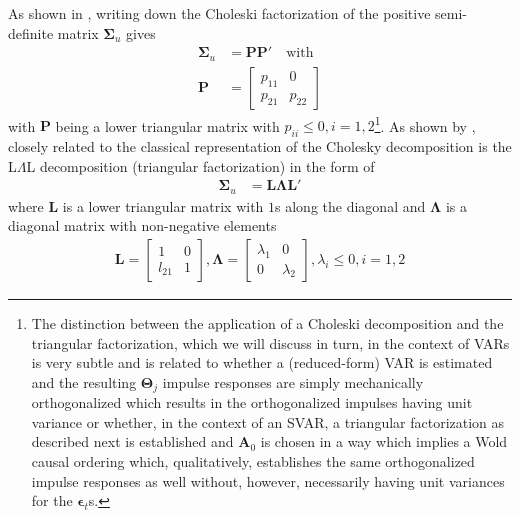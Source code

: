 \documentclass[a4paper,11pt,listof=nochaptergap,oneside,pointednumbers,bibtotoc,bigheadings,liststotoc,hidelinks]{scrbook}
\theoremstyle{mysatz}
\theoremstyle{mydefinition}
\theoremstyle{mytheorem}
\theoremstyle{mybemerkung}
\newcommand{\vect}[1]{\boldsymbol{\mathbf{#1}}}
\begin{document}
As shown in \citet{zivot:00}, writing down the Choleski factorization of the positive semi-definite matrix $\vect{\Sigma}_u$ gives
\begin{equation} \label{eq:svar14}
\begin{split}
 		\vect{\Sigma}_u & = \vect{P}\vect{P'} \quad \text{with} \\
		\vect{P} & = \begin{bmatrix}
    							p_{11} & 0 \\
							p_{21} & p_{22}
 							\end{bmatrix}
\end{split}								
\end{equation}
with $\vect{P}$ being a lower triangular matrix with $p_{ii} \leq 0, i = 1, 2$\footnote{The distinction between the application of a Choleski decomposition and the triangular factorization, which we will discuss in turn, in the context of VARs is very subtle and is related to whether a (reduced-form) VAR is estimated and the resulting $\vect{\Theta}_j$ impulse responses are simply mechanically orthogonalized which results in the orthogonalized impulses having unit variance or whether, in the context of an SVAR, a triangular factorization as described next is established and $\vect{A}_0$ is chosen in a way which implies a Wold causal ordering which, qualitatively, establishes the same orthogonalized impulse responses as well without, however, necessarily having unit variances for the $\vect{\epsilon}_t$s.}. As shown by \citep{zivot:00}, closely related to the classical representation of the Cholesky decomposition is the L$\Lambda$L decomposition (triangular factorization) in the form of 
\begin{equation} \label{eq:svar15}
\begin{split}
 		\vect{\Sigma}_u & = \vect{L}\vect{\Lambda}\vect{L'}
\end{split}								
\end{equation}
where $\vect{L}$ is a lower triangular matrix with $1$s along the diagonal and $\vect{\Lambda}$ is a diagonal matrix with non-negative elements
\begin{equation} \label{eq:svar16}
\begin{split}
	\vect{L} =  \begin{bmatrix}
    				1 & 0 \\
				l_{21} & 1 
 				\end{bmatrix}, 
				\vect{\Lambda} = 
					\begin{bmatrix}
    					\lambda_1 & 0 \\
					0 & \lambda_2 
 					\end{bmatrix},
					\lambda_i \leq 0, i = 1, 2
\end{split}								
\end{equation}
\end{document}
